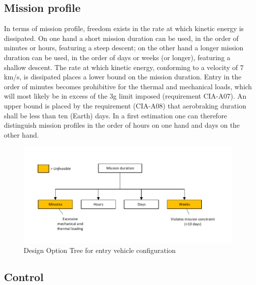 \subsection{Mission profile} \label{sec:DOTprofile}
In terms of mission profile, freedom exists in the rate at which kinetic energy is dissipated. On one hand a short mission duration can be used, in the order of minutes or hours, featuring a steep descent; on the other hand a longer mission duration can be used, in the order of days or weeks (or longer), featuring a shallow descent. The rate at which kinetic energy, conforming to a velocity of 7 km/s, is dissipated places a lower bound on the mission duration. Entry in the order of minutes becomes prohibitive for the thermal and mechanical loads, which will most likely be in excess of the 3g limit imposed (requirement CIA-A07).  An upper bound is placed by the requirement (CIA-A08) that aerobraking duration shall be less than ten (Earth) days. In a first estimation one can therefore distinguish mission profiles in the order of hours on one hand and days on the other hand. 
\begin{figure}[H]
\centering
\includegraphics[width = 1.0\textwidth]{Figure/DOT_missionduration.pdf}
\vspace{-1cm}
\caption{Design Option Tree for entry vehicle configuration}
\label{fig:dotconfig}
\end{figure}

\subsection{Control} \label{sec:DOTcontrol}
